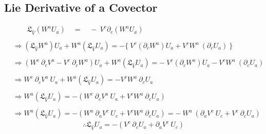 \documentclass[14pt]{article} %
\begin{document}
\subsection{Lie Derivative of a Covector}
\begin{align*}
&\quad \quad \mathfrak{L}_{\hat{V}} (W^a U_a) \quad = \quad - ~V^c \partial_c (W^a U_a) \\\\
&\Rightarrow (\mathfrak{L}_{\hat{V}} W^a) U_a + W^a (\mathfrak{L}_{\hat{V}} U_a) = - \{~V^c (\partial_c W^a)U_a + V^c W^a~ (\partial_c U_a)~\} \\\\
&\Rightarrow (W^c~ \partial_c V^a - V^c~ \partial_c W^a) U_a + W^a (\mathfrak{L}_{\hat{V}} U_a) = -~V^c (\partial_c W^a)U_a - V^c W^a~ (\partial_c U_a) \\\\
& \Rightarrow W^c~ \partial_c V^a ~U_a + W^a (\mathfrak{L}_{\hat{V}} U_a) = - V^c W^a~\partial_c U_a \\\\
& \Rightarrow W^a (\mathfrak{L}_{\hat{V}} U_a) = - (W^c~ \partial_c V^a ~U_a+V^c W^a~\partial_c U_a) \\\\
& \Rightarrow W^a (\mathfrak{L}_{\hat{V}} U_a) = - (W^a~ \partial_a V^c ~U_c+V^c W^a~\partial_c U_a) = -~W^a~(\partial_a V^c ~U_c+V^c~\partial_c U_a)
\end{align*}
\[
\boxed{\therefore \mathfrak{L}_{\hat{V}} U_a = -(V^c~\partial_c U_a + \partial_a V^c ~U_c)}
\]



\end{document}
